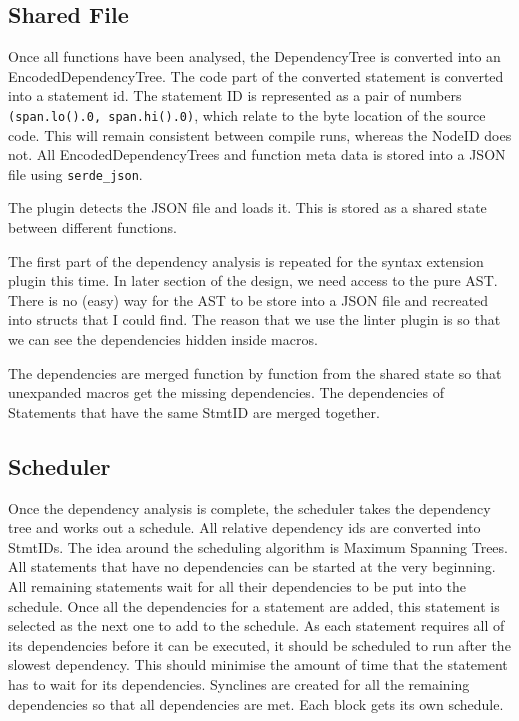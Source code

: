 \subsection{Shared File}

Once all functions have been analysed, the DependencyTree is converted into an EncodedDependencyTree. The code part of the converted statement is converted into a statement id. The statement ID is represented as a pair of numbers \texttt{(span.lo().0, span.hi().0)}, which relate to the byte location of the source code. This will remain consistent between compile runs, whereas the NodeID does not. All EncodedDependencyTrees and function meta data is stored into a JSON file using \texttt{serde\_json}.

The plugin detects the JSON file and loads it. This is stored as a shared state between different functions.

The first part of the dependency analysis is repeated for the syntax extension plugin this time. In later section of the design, we need access to the pure AST. There is no (easy) way for the AST to be store into a JSON file and recreated into structs that I could find. The reason that we use the linter plugin is so that we can see the dependencies hidden inside macros.

The dependencies are merged function by function from the shared state so that unexpanded macros get the missing dependencies. The dependencies of Statements that have the same StmtID are merged together.



\subsection{Scheduler}
Once the dependency analysis is complete, the scheduler takes the dependency tree and works out a schedule. All relative dependency ids are converted into StmtIDs. The idea around the scheduling algorithm is Maximum Spanning Trees. All statements that have no dependencies can be started at the very beginning. All remaining statements wait for all their dependencies to be put into the schedule. Once all the dependencies for a statement are added, this statement is selected as the next one to add to the schedule. As each statement requires all of its dependencies before it can be executed, it should be scheduled to run after the slowest dependency. This should minimise the amount of time that the statement has to wait for its dependencies. Synclines are created for all the remaining dependencies so that all dependencies are met. Each block gets its own schedule.

